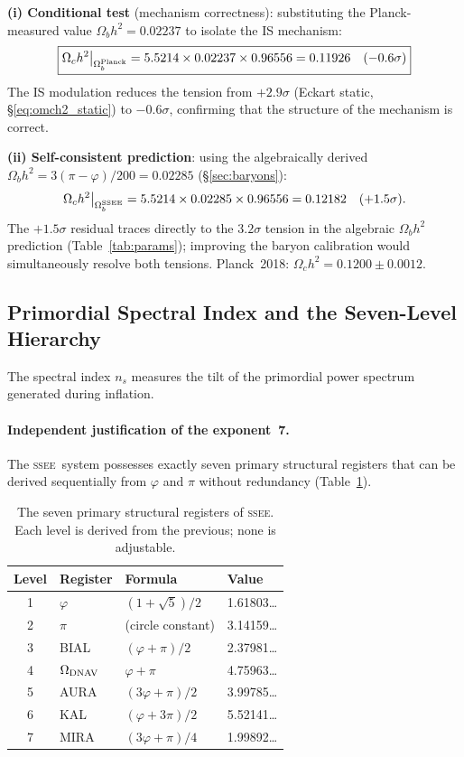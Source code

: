 \documentclass[12pt,a4paper]{article}
\newcommand{\SSEE}{\ifmmode\mathrm{SSEE}\else\textsc{ssee}\fi}
\begin{document}
\textbf{(i) Conditional test} (mechanism correctness): substituting the
Planck-measured value $\Omega_b h^2 = 0.02237$ to isolate the IS mechanism:
\begin{equation}
\boxed{\Omega_c h^2\big|_{\Omega_b^{\rm Planck}}
      = 5.5214\times 0.02237\times 0.96556 = 0.11926 \quad (-0.6\sigma)}
\label{eq:omch2_IS_cond}
\end{equation}
The IS modulation reduces the tension from $+2.9\sigma$ (Eckart static, \S\ref{eq:omch2_static})
to $-0.6\sigma$, confirming that the structure of the mechanism is correct.

\textbf{(ii) Self-consistent prediction}: using the algebraically derived
$\Omega_b h^2 = 3(\pi-\varphi)/200 = 0.02285$ (\S\ref{sec:baryons}):
\begin{equation}
\Omega_c h^2\big|_{\Omega_b^{\rm SSEE}}
      = 5.5214\times 0.02285\times 0.96556 = 0.12182 \quad (+1.5\sigma).
\label{eq:omch2_IS_self}
\end{equation}
The $+1.5\sigma$ residual traces directly to the $3.2\sigma$ tension in the
algebraic $\Omega_b h^2$ prediction (Table~\ref{tab:params}); improving the
baryon calibration would simultaneously resolve both tensions.
Planck~2018: $\Omega_c h^2 = 0.1200\pm0.0012$.

\subsection{Primordial Spectral Index and the Seven-Level Hierarchy}
\label{sec:ns}

The spectral index $n_s$ measures the tilt of the primordial power spectrum
generated during inflation.

\paragraph{Independent justification of the exponent~7.}
The \SSEE\ system possesses exactly seven primary structural registers that
can be derived sequentially from $\varphi$ and $\pi$ without redundancy
(Table~\ref{tab:hierarchy}).

\begin{table}[ht]
\centering
\caption{The seven primary structural registers of \SSEE.
Each level is derived from the previous; none is adjustable.}
\label{tab:hierarchy}
\begin{tabular}{clll}
\toprule
Level & Register & Formula & Value \\
\midrule
1 & $\varphi$ & $(1+\sqrt5)/2$ & 1.61803\ldots \\
2 & $\pi$     & (circle constant) & 3.14159\ldots \\
3 & BIAL      & $(\varphi+\pi)/2$         & 2.37981\ldots \\
4 & $\Omega_{\rm DNAV}$ & $\varphi+\pi$ & 4.75963\ldots \\
5 & AURA      & $(3\varphi+\pi)/2$         & 3.99785\ldots \\
6 & KAL       & $(\varphi+3\pi)/2$         & 5.52141\ldots \\
7 & MIRA      & $(3\varphi+\pi)/4$         & 1.99892\ldots \\
\bottomrule
\end{tabular}
\end{table}
\end{document}
